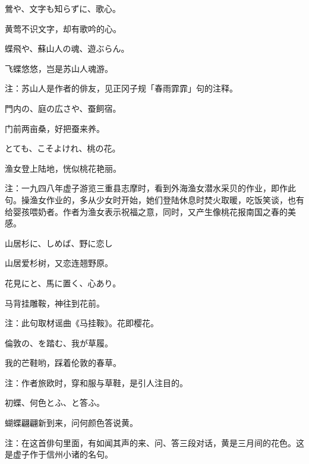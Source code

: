 \begin{haiku}
    {\FH 鶯や、文字も知らずに、歌心。}

    {\FK 黄莺不识文字，却有歌吟的心。}
\end{haiku}

\begin{haiku}
    {\FH 蝶飛や、蘇山人の魂、遊ぶらん。}

    {\FK 飞蝶悠悠，岂是苏山人魂游。}

    {\FT 注：苏山人是作者的俳友，见正冈子规「春雨霏霏」句的注释。}
\end{haiku}

\begin{haiku}
    {\FH 門内の、庭の広さや、蚕飼宿。}

    {\FK 门前两亩桑，好把蚕来养。}
\end{haiku}

\begin{haiku}
    {\FH {}とても、こそよけれ、桃の花。}

    {\FK 渔女登上陆地，恍似桃花艳丽。}

    {\FT 注：一九四八年虚子游览三重县志摩时，看到外海渔女潜水采贝的作业，即作此句。操渔女作业的，多从少女时开始，她们登陆休息时焚火取暖，吃饭笑谈，也有给婴孩喂奶者。作者为渔女表示祝福之意，同时，又产生像桃花报南国之春的美感。}
\end{haiku}

\begin{haiku}
    {\FH 山居杉に、しめば、野に恋し}

    {\FK 山居爱杉树，又恋连翘野原。}
\end{haiku}

\begin{haiku}
    {\FH 花見にと、馬に置く、心あり。}

    {\FK 马背挂雕鞍，神往到花前。}

    {\FT 注：此句取材谣曲《马挂鞍》。花即樱花。}
\end{haiku}

\begin{haiku}
    {\FH 倫敦の、を踏む、我が草履。}

    {\FK 我的芒鞋哟，踩着伦敦的春草。}

    {\FT 注：作者旅欧时，穿和服与草鞋，是引人注目的。}
\end{haiku}

\begin{haiku}
    {\FH 初蝶、何色とふ、と答ふ。}

    {\FK 蝴蝶翩翩新到来，问何颜色答说黄。}

    {\FT 注：在这首俳句里面，有如闻其声的来、问、答三段对话，黄是三月间的花色。这是虚子作于信州小诸的名句。}
\end{haiku}

